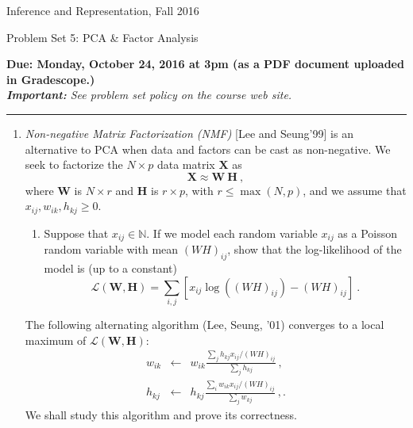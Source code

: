 \documentclass{article}
\newcommand{\ruleskip}{\bigskip\hrule\bigskip}
\begin{document}
\pagestyle{myheadings} 

{\LARGE
\begin{center}Inference and Representation, Fall 2016\end{center}
}

{\Large
Problem Set 5: PCA \& Factor Analysis
}


{\bf Due: Monday, October 24, 2016 at 3pm (as a PDF document uploaded in
  Gradescope.)}\\

{\em {\bf Important:} See problem set policy on the course web site.}
\ruleskip


\begin{enumerate}

\item \emph{Non-negative Matrix Factorization (NMF)} [Lee and Seung'99] is an alternative to PCA when 
data and factors can be cast as non-negative. We seek to factorize the $N \times p$ data matrix $\mathbf{X}$ as
\begin{equation}
\mathbf{X} \approx \mathbf{ W ~H}~,
\end{equation}
where $\mathbf{W}$ is $N \times r$ and $\mathbf{H}$ is $r \times p$, with $r \leq \max(N,p)$, and 
we assume that $x_{ij}, w_{ik}, h_{kj} \geq 0$.
\begin{enumerate}
\item Suppose that $x_{ij} \in \mathbb{N}$. If we model each random variable $x_{ij}$ as a Poisson 
random variable with mean $(WH)_{ij}$, show that the log-likelihood of the model is (up to a constant) 
\begin{equation}
\label{bla}
\mathcal{L}(\mathbf{W}, \mathbf{H}) = \sum_{i, j} [x_{ij} \log( (WH)_{ij} ) - (WH)_{ij}] ~.
\end{equation}

\end{enumerate}

 The following alternating algorithm (Lee, Seung, '01) converges to a local maximum of $\mathcal{L}(\mathbf{W}, \mathbf{H})$:
\begin{eqnarray}
\label{ble}
w_{ik} &\leftarrow& w_{ik} \frac{\sum_j h_{kj}x_{ij} / ( WH)_{ij}}{\sum_j h_{kj}}~,\\
h_{kj} &\leftarrow& h_{kj} \frac{\sum_i w_{ik}x_{ij} / ( WH)_{ij}}{\sum_j w_{kj}}~,.
\end{eqnarray}
We shall study this algorithm and prove its correctness. 


\end{enumerate}
\end{document}
